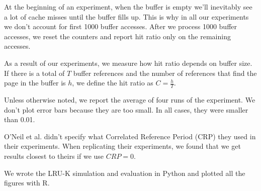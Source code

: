 
At the beginning of an experiment, when the buffer is empty we'll inevitably see a lot of cache misses until the buffer fills up. This is why in all our experiments we don't account for first 1000 buffer accesses. After we process 1000 buffer accesses, we reset the counters and report hit ratio only on the remaining accesses.

As a result of our experiments, we measure how hit ratio depends on buffer size. If there is a total of $T$ buffer references and the number of references that find the page in the buffer is $h$, we define the hit ratio as $C = \frac{h}{T}$.

Unless otherwise noted, we report the average of four runs of the experiment. We don't plot error bars because they are too small. In all cases, they were smaller than 0.01.

O'Neil et al. \cite{lruk} didn't specify what Correlated Reference Period (CRP) they used in their experiments. When replicating their experiments, we found that we get results closest to theirs if we use $CRP = 0$.

We wrote the LRU-K simulation and evaluation in Python and plotted all the figures with R.